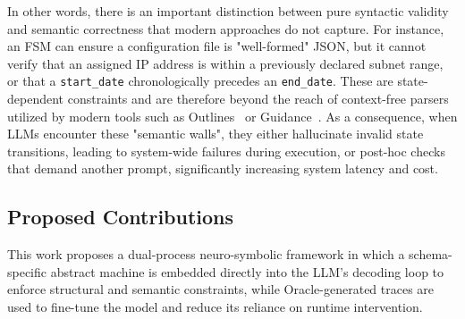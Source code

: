 In other words, there is an important distinction between pure syntactic validity and
semantic correctness that modern approaches do not capture. For instance, an FSM
can ensure a configuration file is "well-formed" JSON, but it cannot verify that
an assigned IP address is within a previously declared subnet range, or that a
\texttt{start\_date} chronologically precedes an \texttt{end\_date}. These are
state-dependent constraints and are therefore beyond the reach of context-free parsers
utilized by modern tools such as Outlines~\cite{willard2023efficient} or Guidance~\cite{lundberg_guidance_2025}. As a consequence,
when LLMs encounter these "semantic walls", they either hallucinate invalid
state transitions, leading to system-wide failures during execution, or post-hoc
checks that demand another prompt, significantly increasing system latency and
cost.

\subsection{Proposed Contributions}
This work proposes a dual-process neuro-symbolic framework in which a schema-specific 
abstract machine is embedded directly into the LLM's decoding loop to enforce structural
 and semantic constraints, while Oracle-generated traces are used to fine-tune the model 
 and reduce its reliance on runtime intervention.
